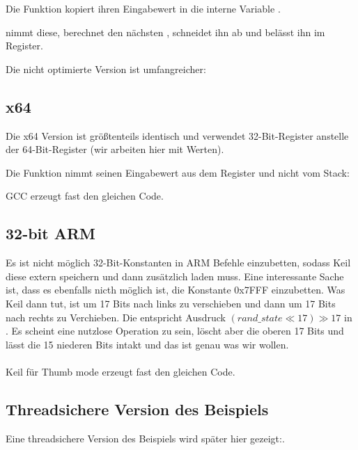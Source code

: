 Die Funktion  kopiert ihren Eingabewert in die interne Variable .

 nimmt diese, berechnet den nächsten , schneidet ihn ab und belässt ihn im \EAX Register.

Die nicht optimierte Version ist umfangreicher:



\subsection{x64}
Die x64 Version ist größtenteils identisch und verwendet 32-Bit-Register anstelle der 64-Bit-Register (wir arbeiten
hier mit \Tint Werten).

Die Funktion  nimmt seinen Eingabewert aus dem Register \ECX und nicht vom Stack:



GCC erzeugt fast den gleichen Code.

\subsection{32-bit ARM}


Es ist nicht möglich 32-Bit-Konstanten in ARM Befehle einzubetten, sodass Keil diese extern speichern und dann
zusätzlich laden muss. Eine interessante Sache ist, dass es ebenfalls nicth möglich ist, die Konstante 0x7FFF
einzubetten.
Was Keil dann tut, ist  um 17 Bits nach links zu verschieben und dann um 17 Bits nach rechts zu
Verchieben.
Die entspricht Ausdruck $(rand\_state \ll 17) \gg 17$ in \CCpp.
Es scheint eine nutzlose Operation zu sein, löscht aber die oberen 17 Bits und lässt die 15 niederen Bits intakt und das
ist genau was wir wollen.\\\\

\Optimizing Keil für Thumb mode erzeugt fast den gleichen Code.



\subsection{Threadsichere Version des Beispiels}
Eine threadsichere Version des Beispiels wird später hier gezeigt:. 
